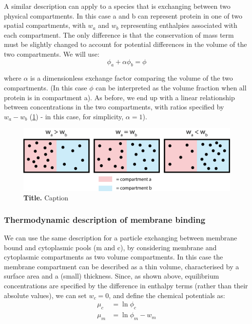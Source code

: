 \documentclass[12pt]{"article"}
\newcommand{\mycaption}[2]{\caption[#1]{\textbf{#1.} #2}}
\begin{document}
A similar description can apply to a species that is exchanging between two physical compartments. In this case a and b can represent protein in one of two spatial compartments, with $w_a$ and $w_b$ representing enthalpies associated with each compartment. The only difference is that the conservation of mass term must be slightly changed to account for potential differences in the volume of the two compartments. We will use:
\begin{equation}
\phi_a + \alpha\phi_b = \phi
\end{equation}

where $\alpha$ is a dimensionless exchange factor comparing the volume of the two compartments. (In this case $\phi$ can be interpreted as the volume fraction when all protein is in compartment a). As before, we end up with a linear relationship between concentrations in the two compartments, with ratios specified by $w_a - w_b$ (\cref{fig:thermodynamic_simple_example}) - in this case, for simplicity, $\alpha = 1$).

\begin{figure}[!h]
\includegraphics[scale=0.9]{thermodynamic_simple_example}
\setlength{\abovecaptionskip}{20pt}
\centering
\mycaption{Title}{Caption}
\label{fig:thermodynamic_simple_example}
\end{figure}

\subsubsection{Thermodynamic description of membrane binding}

We can use the same description for a particle exchanging between membrane bound and cytoplasmic pools (m and c), by considering membrane and cytoplasmic compartments as two volume compartments. In this case the membrane compartment can be described as a thin volume, characterised by a surface area and a (small) thickness. Since, as shown above, equilibrium concentrations are specified by the difference in enthalpy terms (rather than their absolute values), we can set $w_c = 0$, and define the chemical potentials as:
\begin{align}
\mu_c &= \ln\phi_c\\
\mu_m &= \ln\phi_m - w_m
\end{align} 
\end{document}
